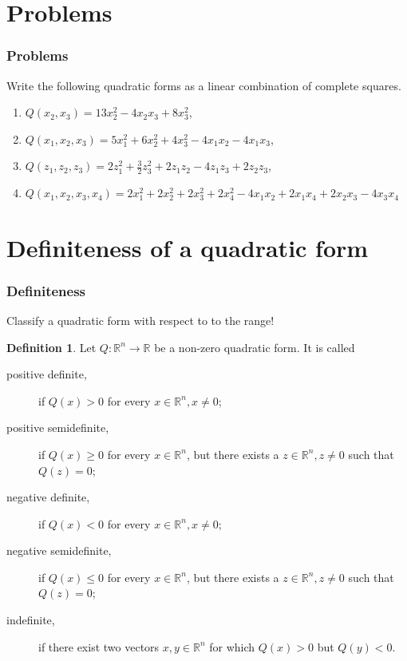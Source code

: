 \documentclass[aspectratio=169,notheorems]{corvinusmetropolis}
\theoremstyle{definition}
\newtheorem{definition}[theorem]{Definition}
\begin{document}
\section{Problems}
\begin{frame}
    \frametitle{Problems}
    \begin{block}{ Write the following quadratic forms as a linear combination of complete squares.}
        \begin{enumerate}
            \item 
            $Q\left( x_2,x_3 \right)=13x_2^2-4x_2x_3+8x_3^2$,
            \item
            $Q\left( x_1,x_2,x_3 \right)=5x_1^2+6x_2^2+4x_3^2-4x_1x_2-4x_1x_3$,
            \item
            $Q\left( z_1,z_2,z_3 \right)=2z_1^2+\frac{3}{2}z_3^2+2z_1z_2-4z_1z_3+2z_2z_3$,
            \item
            $Q\left( x_1,x_2,x_3,x_4 \right)=2x_1^2+2x_2^2+2x_3^2+2x_4^2-4x_1x_2+2x_1x_4+2x_2x_3-4x_3x_4$
        \end{enumerate}
    \end{block}
\end{frame}
\section{Definiteness of a quadratic form}
\begin{frame}
    \frametitle{Definiteness}
    Classify a quadratic form with respect to to the range!
    \begin{definition}
        Let $Q:\mathbb{R}^n\to\mathbb{R}$ be a non-zero quadratic form. It is called
        \begin{description}
            \item[positive definite,] if $Q\left( x \right)>0$ for every $x\in\mathbb{R}^n,x\neq 0$;
            \item[positive semidefinite,] if $ Q\left( x \right)\geq 0$ for every $x\in\mathbb{R}^n$,
                but there exists a $z\in\mathbb{R}^n, z\neq 0$ such that $Q\left( z \right)=0$;
            \item[negative definite,] if $ Q\left( x \right)<0$ for every $x\in\mathbb{R}^n,x\neq 0;$
            \item[negative semidefinite,] if $ Q\left( x \right)\leq 0$ for every $x\in\mathbb{R}^n$,
                but there exists a $z\in\mathbb{R}^n, z\neq 0$ such that $Q\left( z \right)=0$;
            \item[indefinite,] if there exist two vectors $x,y\in\mathbb{R}^n$ for which
                $Q\left( x \right)>0$ but $Q\left( y \right)<0$.
        \end{description}
    \end{definition}
\end{frame}
\end{document}
